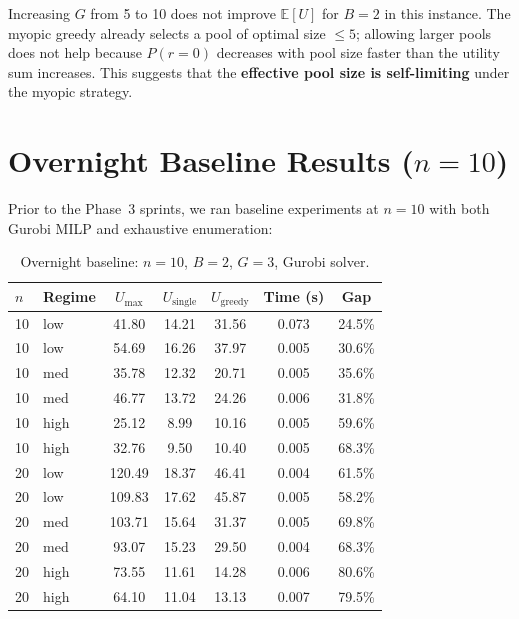 \documentclass[11pt,a4paper]{article}
\newcommand{\E}{\mathbb{E}}
\begin{document}
\begin{finding}
Increasing $G$ from 5 to 10 does not improve $\E[U]$ for $B=2$ in this instance.
The myopic greedy already selects a pool of optimal size $\leq 5$; allowing larger pools does not help because $P(r{=}0)$ decreases with pool size faster than the utility sum increases.
This suggests that the \textbf{effective pool size is self-limiting} under the myopic strategy.
\end{finding}


\section{Overnight Baseline Results ($n=10$)}
\label{sec:overnight}

Prior to the Phase~3 sprints, we ran baseline experiments at $n=10$ with both Gurobi MILP and exhaustive enumeration:

\begin{table}[h]
\centering
\caption{Overnight baseline: $n=10$, $B=2$, $G=3$, Gurobi solver.}
\label{tab:overnight}
\begin{tabular}{llccccc}
\toprule
$n$ & Regime & $U_{\max}$ & $U_{\text{single}}$ & $U_{\text{greedy}}$ & Time (s) & Gap \\
\midrule
10 & low  & 41.80 & 14.21 & 31.56 & 0.073 & 24.5\% \\
10 & low  & 54.69 & 16.26 & 37.97 & 0.005 & 30.6\% \\
10 & med  & 35.78 & 12.32 & 20.71 & 0.005 & 35.6\% \\
10 & med  & 46.77 & 13.72 & 24.26 & 0.006 & 31.8\% \\
10 & high & 25.12 &  8.99 & 10.16 & 0.005 & 59.6\% \\
10 & high & 32.76 &  9.50 & 10.40 & 0.005 & 68.3\% \\
\midrule
20 & low  & 120.49 & 18.37 & 46.41 & 0.004 & 61.5\% \\
20 & low  & 109.83 & 17.62 & 45.87 & 0.005 & 58.2\% \\
20 & med  & 103.71 & 15.64 & 31.37 & 0.005 & 69.8\% \\
20 & med  &  93.07 & 15.23 & 29.50 & 0.004 & 68.3\% \\
20 & high &  73.55 & 11.61 & 14.28 & 0.006 & 80.6\% \\
20 & high &  64.10 & 11.04 & 13.13 & 0.007 & 79.5\% \\
\bottomrule
\end{tabular}
\end{table}
\end{document}

